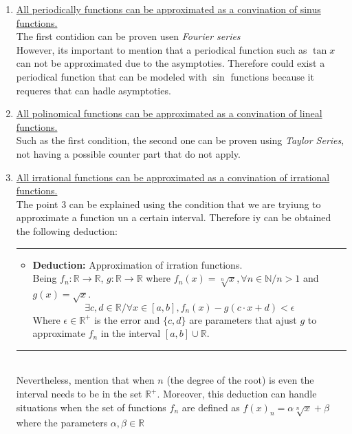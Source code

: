 \documentclass[a4paper, 11pt]{article}
\begin{document}
\begin{enumerate}
    \item \underline{All periodically functions can be approximated as a convination of sinus functions.}\\
    The first contidion can be proven usen \textit{Fourier series}\\
    However, its important to mention that a periodical function such as $\tan{x}$ can not be approximated due to the asymptoties. 
    Therefore could exist a periodical function that can be modeled with $\sin$ functions because it requeres that can hadle asymptoties.\\
    \item \underline{All polinomical functions can be approximated as a convination of lineal functions.}\\
    Such as the first condition, the second one can be proven using \textit{Taylor Series}, not having a possible counter part that do not apply.\\
    \item \underline{All irrational functions can be approximated as a convination of irrational functions.}\\
    The point 3 can be explained using the condition that we are tryiung to approximate a function un a certain interval. Therefore iy can be obtained the following deduction:\\
    \rule{\linewidth}{0.4pt}
    \begin{itemize}
        \item \textbf{Deduction:} Approximation of irration functions.\\
        Being $f_n:\mathbb{R}\rightarrow\mathbb{R}$, $g:\mathbb{R}\rightarrow\mathbb{R}$ where $f_n(x) = \sqrt[n]{x}, \forall n \in \mathbb{N} / n > 1$ and $g(x) = \sqrt{x}$.\\
        $$ \exists c,d \in \mathbb{R} / \forall x \in [a,b], f_n(x)- g(c\cdot x + d) < \epsilon$$ 
        Where $\epsilon\in\mathbb{R^+}$ is the error and $\{ c,d \}$ are parameters that ajust $g$ to approximate $f_n$ in the interval $[a,b]\cup \mathbb{R}$.
    \end{itemize}
    \rule{\linewidth}{0.4pt}\\
    Nevertheless, mention that when $n$ (the degree of the root) is even the interval needs to be in the set $\mathbb{R^+}$. Moreover, this deduction can handle situations when the set of functions $f_n$ are defined as $f(x)_n = \alpha \sqrt[n]{x} + \beta$ where the parameters $\alpha,\beta \in \mathbb{R}$ \\

\end{enumerate}
\end{document}
